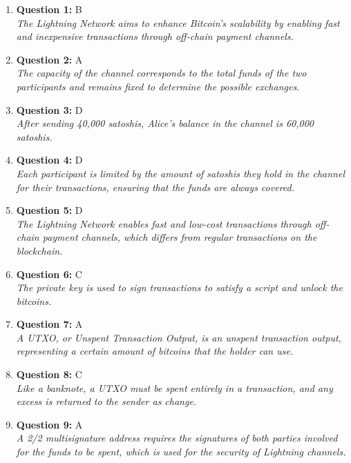 \documentclass[12pt,a4paper]{article}
\begin{document}
\begin{enumerate}
\item \textbf{Question 1:} B
\\ \textit{The Lightning Network aims to enhance Bitcoin's scalability by enabling fast and inexpensive transactions through off-chain payment channels.}

\item \textbf{Question 2:} A
\\ \textit{The capacity of the channel corresponds to the total funds of the two participants and remains fixed to determine the possible exchanges.}

\item \textbf{Question 3:} D
\\ \textit{After sending 40,000 satoshis, Alice's balance in the channel is 60,000 satoshis.}

\item \textbf{Question 4:} D
\\ \textit{Each participant is limited by the amount of satoshis they hold in the channel for their transactions, ensuring that the funds are always covered.}

\item \textbf{Question 5:} D
\\ \textit{The Lightning Network enables fast and low-cost transactions through off-chain payment channels, which differs from regular transactions on the blockchain.}

\item \textbf{Question 6:} C
\\ \textit{The private key is used to sign transactions to satisfy a script and unlock the bitcoins.}

\item \textbf{Question 7:} A
\\ \textit{A UTXO, or Unspent Transaction Output, is an unspent transaction output, representing a certain amount of bitcoins that the holder can use.}

\item \textbf{Question 8:} C
\\ \textit{Like a banknote, a UTXO must be spent entirely in a transaction, and any excess is returned to the sender as change.}

\item \textbf{Question 9:} A
\\ \textit{A 2/2 multisignature address requires the signatures of both parties involved for the funds to be spent, which is used for the security of Lightning channels.}


\end{enumerate}
\end{document}
